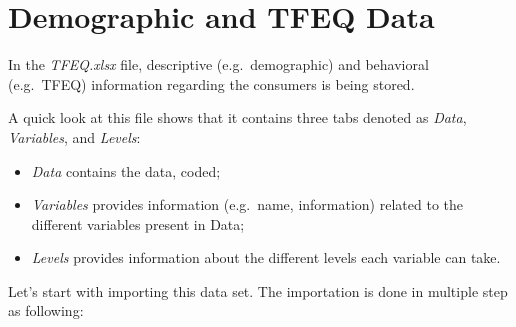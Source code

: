 \documentclass[
]{book}
\newenvironment{Shaded}{\begin{snugshade}}{\end{snugshade}}
\newcommand{\AttributeTok}[1]{\textcolor[rgb]{0.77,0.63,0.00}{#1}}
\newcommand{\DecValTok}[1]{\textcolor[rgb]{0.00,0.00,0.81}{#1}}
\newcommand{\FunctionTok}[1]{\textcolor[rgb]{0.00,0.00,0.00}{#1}}
\newcommand{\NormalTok}[1]{#1}
\newcommand{\OtherTok}[1]{\textcolor[rgb]{0.56,0.35,0.01}{#1}}
\newcommand{\SpecialCharTok}[1]{\textcolor[rgb]{0.00,0.00,0.00}{#1}}
\newcommand{\StringTok}[1]{\textcolor[rgb]{0.31,0.60,0.02}{#1}}
\providecommand{\tightlist}{%
  \setlength{\itemsep}{0pt}\setlength{\parskip}{0pt}}
\begin{document}
\hypertarget{demographic-and-tfeq-data}{%
\section{Demographic and TFEQ Data}\label{demographic-and-tfeq-data}}

In the \emph{TFEQ.xlsx} file, descriptive (e.g.~demographic) and behavioral (e.g.~TFEQ) information regarding the consumers is being stored.

A quick look at this file shows that it contains three tabs denoted as \emph{Data}, \emph{Variables}, and \emph{Levels}:

\begin{itemize}
\tightlist
\item
  \emph{Data} contains the data, coded;
\item
  \emph{Variables} provides information (e.g.~name, information) related to the different variables present in Data;
\item
  \emph{Levels} provides information about the different levels each variable can take.
\end{itemize}

Let's start with importing this data set. The importation is done in multiple step as following:

\begin{Shaded}
\end{Shaded}
\end{document}
